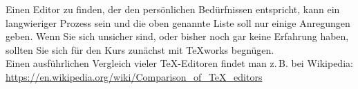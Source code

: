 \documentclass[
	ausgabe=2016-11-24,
	titel=Installationshinweise,
	shortverb=true,
]{../tex/latexkurs-exercise}
\begin{document}
\noindent Einen Editor zu finden, der den persönlichen Bedürfnissen entspricht, kann ein langwieriger Prozess sein und die oben genannte Liste soll nur einige Anregungen geben. Wenn Sie sich unsicher sind, oder bisher noch gar keine Erfahrung haben, sollten Sie sich für den Kurs zunächst mit \TeX works begnügen.\\Einen ausführlichen Vergleich vieler \TeX-Editoren findet man z.\,B. bei Wikipedia:\\ \url{https://en.wikipedia.org/wiki/Comparison_of_TeX_editors}
\end{document}
